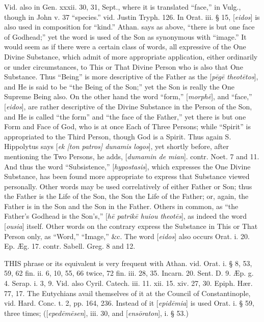 Vid. also in Gen. xxxii. 30, 31, Sept., where it
is translated “face,” in Vulg., though in John v. 37
“species.” vid. Justin Tryph. 126. In Orat. iii. § 15, [\emph{eidos}]
is also used in composition for “kind.” Athan. says as above,
“there is but one face of Godhead;” yet the word is used of the
Son as synonymous with “image.” It would seem as if there
were a certain class of words, all expressive of the One Divine
Substance, which admit of more appropriate application, either
ordinarily or under circumstances, to This or That Divine Person who
is also that One Substance. Thus “Being” is more descriptive of
the Father as the [\emph{p\={e}g\={e} theot\={e}tos}], and He
is said to be “the Being of the Son;” yet the Son is really the
One Supreme Being also. On the other hand the word “form,” [\emph{morph\={e}}],
and “face,” [\emph{eidos}], are rather descriptive of the Divine
Substance in the Person of the Son, and He is called “the form”
and “the face of the Father,” yet there is but one Form and Face
of God, who is at once Each of Three Persons; while “Spirit” is
appropriated to the Third Person, though God is a Spirit. Thus again
S. Hippolytus says [\emph{ek [ton patros] dunamis logos}], yet shortly
before, after mentioning the Two Persons, he adds, [\emph{dumamin de mian}].
contr. Noet. 7 and 11. And thus the word “Subsistence,” [\emph{hypostasis}],
which expresses the One Divine Substance, has been found more
appropriate to express that Substance viewed personally. Other words
may be used correlatively of either Father or Son; thus the Father is
the Life of the Son, the Son the Life of the Father; or, again, the
Father is in the Son and the Son in the Father. Others in common, as
“the Father’s Godhead is the Son’s,” [\emph{h\={e} patrik\={e}
huiou theot\={e}s}], as indeed the word [\emph{ousia}] itself.
Other words on the contrary express the Substance in This or That
Person only, as “Word,” “Image,” \&c. The word [\emph{eidos}]
also occurs Orat. i. 20. Ep. Æg. 17. contr. Sabell. Greg. 8 and 12.


THIS
phrase or its equivalent is very frequent with Athan. vid. Orat. i. §
8, 53, 59, 62 fin. ii. 6, 10, 55, 66 twice, 72 fin. iii. 28, 35.
Incarn. 20. Sent. D. 9. Æp. g. 4. Serap. i. 3, 9. Vid. also Cyril.
Catech. iii. 11. xii. 15. xiv. 27, 30. Epiph. Hær. 77, 17. The
Eutychians avail themselves of it at the Council of Constantinople,
vid. Hard. Conc. t. 2, pp. 164, 236. Instead of it [\emph{epid\={e}mia}]
is used Orat. i. § 59, three times; ([\emph{eped\={e}m\={e}sen}],
iii. 30, and [\emph{ens\={o}raton}], i. § 53.)

